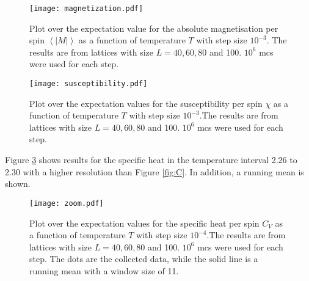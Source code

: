 \begin{figure}[htbp]
	\centering
	\texttt{[image: magnetization.pdf]}
	\caption{Plot over the expectation value for the absolute magnetisation per spin $\left\langle |M|\right\rangle$ as a function of temperature $T$ with step size $10^{-3}$. The results are from lattices with size $L=40,60,80$ and 100. $10^6$ mcs were used for each step.}
	\label{fig:M}
\end{figure}

\begin{figure}[htbp]
	\centering
	\texttt{[image: susceptibility.pdf]}
	\caption{Plot over the expectation values for the susceptibility per spin $\chi$ as a function of temperature $T$ with step size $10^{-3}$.The results are from lattices with size $L=40,60,80$ and 100. $10^6$ mcs were used for each step.}
	\label{fig:Chi}
\end{figure}

Figure \ref{fig:zoom} shows results for the specific heat in the temperature interval 2.26 to 2.30 with a higher resolution than Figure \ref{fig:C}. In addition, a running mean is shown.  
\begin{figure}[htbp]
	\centering
	\texttt{[image: zoom.pdf]}
	\caption{Plot over the expectation values for the specific heat per spin $C_V$ as a function of temperature $T$ with step size $10^{-4}$.The results are from lattices with size $L=40,60,80$ and 100. $10^6$ mcs were used for each step. The dots are the collected data, while the solid line is a running mean with a window size of 11.}
	\label{fig:zoom}
\end{figure}

